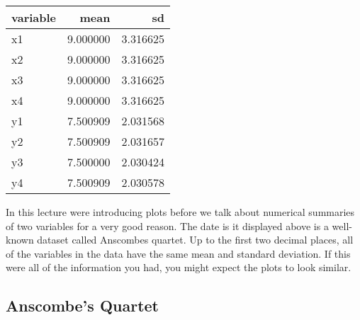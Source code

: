 \documentclass[
  letterpaper,
  DIV=11,
  numbers=noendperiod]{scrreprt}
\begin{document}
\begin{longtable}[]{@{}lrr@{}}
\toprule\noalign{}
variable & mean & sd \\
\midrule\noalign{}
\endhead
\bottomrule\noalign{}
\endlastfoot
x1 & 9.000000 & 3.316625 \\
x2 & 9.000000 & 3.316625 \\
x3 & 9.000000 & 3.316625 \\
x4 & 9.000000 & 3.316625 \\
y1 & 7.500909 & 2.031568 \\
y2 & 7.500909 & 2.031657 \\
y3 & 7.500000 & 2.030424 \\
y4 & 7.500909 & 2.030578 \\
\end{longtable}

In this lecture were introducing plots before we talk about numerical
summaries of two variables for a very good reason. The date is it
displayed above is a well-known dataset called Anscombes quartet. Up to
the first two decimal places, all of the variables in the data have the
same mean and standard deviation. If this were all of the information
you had, you might expect the plots to look similar.

\hypertarget{anscombes-quartet}{%
\subsection{Anscombe's Quartet}\label{anscombes-quartet}}
\end{document}
